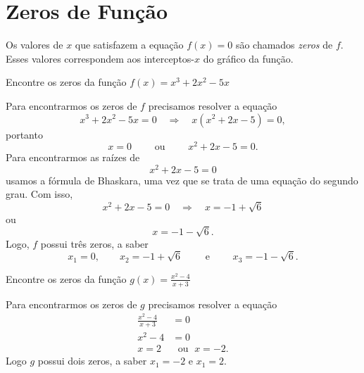 \section{Zeros de Função}

Os valores de $x$ que satisfazem a equação $f(x)=0$ são chamados
\emph{zeros}
de $f$. Esses valores correspondem aos interceptos-$x$ do gráfico da função.

\begin{example}
  Encontre os zeros da função \(f(x) = x^3+2x^2-5x\)

  \solution
  Para encontrarmos os zeros de $f$ precisamos resolver a equação
  \[
    x^3 + 2x^2 - 5x = 0
    \quad\Rightarrow\quad
    x( x^2 + 2x - 5 ) = 0,
  \]
  portanto
  \[
    x = 0
    \qquad\text{ ou }\qquad
    x^2 + 2x - 5 = 0.
  \]
  Para encontrarmos as raízes de
  \[
    x^2 + 2x- 5 =0
  \]
  usamos a fórmula de Bhaskara, uma vez que se trata de uma equação
  do segundo grau.
  Com isso,
  \[
    x^2 + 2x - 5 = 0
    \quad\Rightarrow\quad
    x = -1+\sqrt{6}
  \]
  ou
  \[
    x = -1-\sqrt{6}.
  \]
  Logo, $f$ possui três zeros, a saber
  \[
    x_1 = 0,             \qquad
    x_2 =-1+\sqrt{6}     \qquad
    \text{ e }           \qquad
    x_3 =-1-\sqrt{6}.
  \]
\end{example}

\begin{example}
  Encontre os zeros da função \(g(x) = \frac{x^2-4}{x+3}\)

  \solution
  Para encontrarmos os zeros de $g$ precisamos resolver a equação
  \begin{align*}
    \frac{x^2-4}{x+3} & = 0 \\[2mm]
    x^2-4             & = 0 \\
    x=2               & \;\text{ ou }\; x=-2.
  \end{align*}
  Logo $g$ possui dois zeros, a saber $x_1=-2$ e $x_1=2$.
\end{example}

